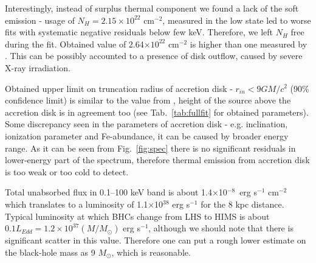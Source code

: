 \documentclass[a4paper,fleqn,usenatbib]{mnras}
\begin{document}
Interestingly, instead of surplus thermal component we found a lack of the soft emission - usage of $N_{H} = 2.15\times10^{22}$ cm$^{-2}$, measured in the low state \citep{fuerst16_gx339} led to worse fits with systematic negative residuals below few keV. 
Therefore, we left $N_{H}$ free during the fit. 
Obtained value of 2.64$\times10^{22}$ cm$^{-2}$ is higher than one measured by \cite{fuerst16_gx339}. 
This can be possibly accounted to a presence of disk outflow, caused by severe X-ray irradiation. 

Obtained upper limit on truncation radius of accretion disk - $r_{in} < 9 GM/c^{2}$ (90\% confidence limit) is similar to the value from \cite{miller15_nust}, height of the source above the accretion disk is in agreement too (see Tab.~\ref{tab:fullfit} for obtained parameters). 
Some discrepancy seen in the parameters of accretion disk - e.g. inclination, ionization parameter and Fe-abundance, it can be caused by broader energy range. 
As it can be seen from Fig.~\ref{fig:spec} there is no significant residuals in lower-energy part of the spectrum, therefore thermal emission from accretion disk is too weak or too cold to detect. 

Total unabsorbed flux in 0.1--100 keV band is about 1.4$\times$10$^{-8}$~erg s$^{-1}$ cm$^{-2}$ which translates to a luminosity of 1.1$\times$10$^{38}$ erg s$^{-1}$ for the 8 kpc distance. 
Typical luminosity at which BHCs change from LHS to HIMS is about $0.1 L_{Edd} = 1.2\times10^{37} (M/M_{\odot})$ erg s$^{-1}$, although we should note that there is significant scatter in this value. 
Therefore one can put a rough lower estimate on the black-hole mass as 9 $M_{\odot}$, which is reasonable.
\end{document}

